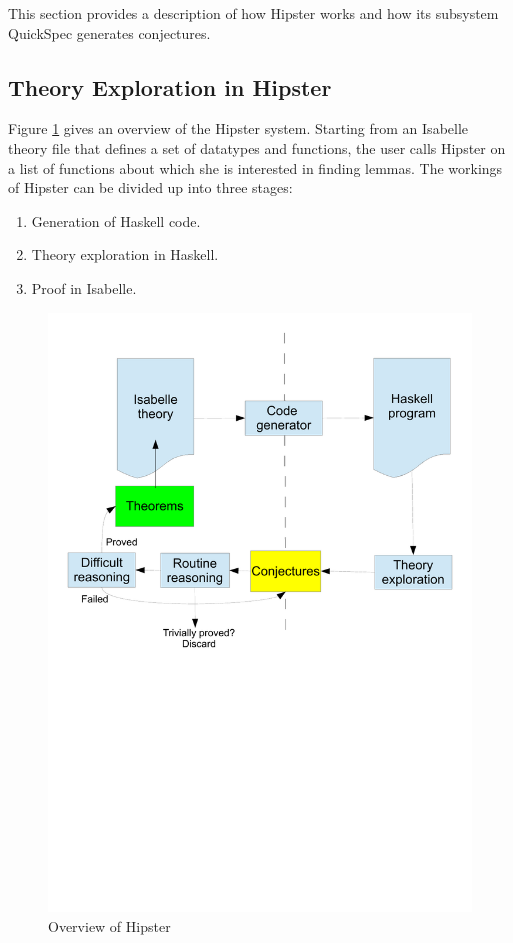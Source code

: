 \label{sec:background}
This section provides a description of how Hipster works and how its subsystem QuickSpec generates conjectures.

\subsection{Theory Exploration in Hipster}
Figure \ref{fig:hipster} gives an overview of the Hipster system.
%
Starting from an Isabelle theory file that defines a set of datatypes and functions, the user calls Hipster on a list of functions about which she is interested in finding lemmas.
%
The workings of Hipster can be divided up into three stages:
\begin{enumerate}
\item Generation of Haskell code. 
\item Theory exploration in Haskell.
\item Proof in Isabelle.
\end{enumerate}

\begin{figure}[htbp]
\begin{center}
\includegraphics[scale=0.4]{hipster}
\caption{Overview of Hipster}
\label{fig:hipster}
\end{center}
\end{figure}

